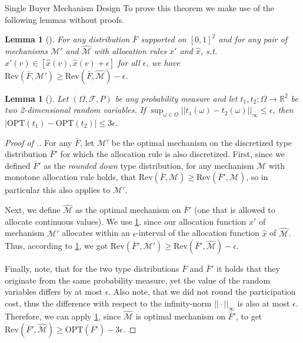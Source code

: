 \documentclass[11pt,a4paper]{article}
\newtheorem{lemma}[theorem]{Lemma}
\newcommand{\1}[1]{\mbox{\rm\bf 1}_{#1}}
\begin{document}
\begin{section}{Single Buyer Mechanism Design}
 To prove this theorem we make use of the following lemmas without proofs.

 \begin{lemma}[\citet{primary}]
     \label{lemma:allocation-function-within-e}
     For any distribution $\bar{F}$ supported on $[0,1]^2$ and for any pair of mechanisms $\mathcal{M}'$ and $\widehat{\mathcal{M}}$
     with allocation rules $x'$ and $\hat{x}$, s.t. $x'(v) \in [\hat{x}(v), \hat{x}(v) + \epsilon]$ for all $\epsilon$, we have $\mathrm{Rev}(\bar{F}, \mathcal{M}') \geq \mathrm{Rev}(\bar{F}, \widehat{\mathcal{M}}) - \epsilon$.
 \end{lemma}
 \begin{lemma}[\citet{primary}]
     \label{lemma:difference-in-optimal-mechanisms}
     Let $(\Omega, \mathcal{F}, P)$ be any probability measure and let $t_1, t_2: \Omega \rightarrow \mathbb{R}^2$ be two 2-dimensional random variables.
     If $\sup_{\omega \in \Omega} || t_1(\omega) - t_2(\omega) ||_\infty \leq \epsilon$, then $|\mathrm{OPT}(t_1) - \mathrm{OPT}(t_2)| \leq 3\epsilon$.
 \end{lemma}

 \begin{proof}[Proof of .]
     For any $\bar{F}$, let $\mathcal{M}'$ be the optimal mechanism on the discretized type distribution $\bar{F}'$ for which the allocation rule is also discretized.
     First, since we defined $\bar{F}'$ as the \textit{rounded down} type distribution, for any mechanism $\mathcal{M}$ with monotone allocation rule holds, that $\mathrm{Rev}(\bar{F}, \mathcal{M}) \geq \mathrm{Rev}(\bar{F}', \mathcal{M})$, so in particular this also applies to $\mathcal{M}'$.

     Next, we define $\widehat{\mathcal{M}}$ as the optimal mechanism on $\bar{F}'$ (one that is allowed to allocate continuous values).
     We use \cref{lemma:allocation-function-within-e}, since our allocation function $x'$ of mechanism $\mathcal{M}'$
     allocates within an $\epsilon$-interval of the allocation function $\hat{x}$ of $\widehat{\mathcal{M}}$.
     Thus, according to \cref{lemma:allocation-function-within-e}, we got $\mathrm{Rev}(\bar{F}', \mathcal{M}') \geq \mathrm{Rev}(\bar{F}', \widehat{\mathcal{M}}) - \epsilon$.

     Finally, note, that for the two type distributions $\bar{F}$ and $\bar{F}'$ it holds that they originate from the same probability measure, yet the value of the random variables differs by at most $\epsilon$.
     Also note, that we did not round the participation cost, thus the difference with respect to the infinity-norm $|| \cdot ||_{\infty}$ is also at most $\epsilon$.
     Therefore, we can apply \cref{lemma:difference-in-optimal-mechanisms}, since $\widehat{\mathcal{M}}$ is optimal mechanism on $\bar{F}'$,
     to get $\mathrm{Rev}(\bar{F}', \widehat{\mathcal{M}}) \geq \mathrm{OPT}(\bar{F}') - 3\epsilon$.


\end{proof}
\end{section}
\end{document}
